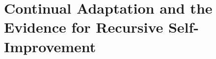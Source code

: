 \chapter{Continual Adaptation and the Evidence for Recursive Self-Improvement}\label{ch:C30}









